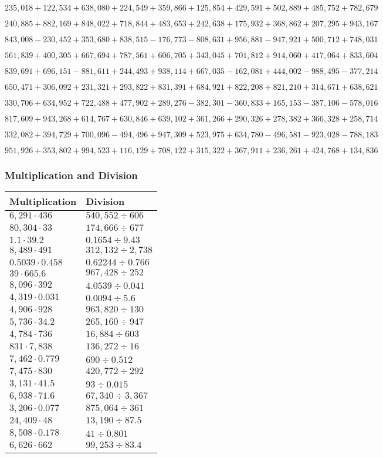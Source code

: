 \(235,018+122,534+638,080+224,549+359,866+125,854+429,591+502,889+485,752+ 782,679\)

\(240,885+882,169+848,022+718,844+483,653+242,638+175,932+368,862+207,295+943,167\)

\(843,008-230,452+353,680+838,515-176,773-808,631+956,881-947,921+500,712+748,031\)

\(561,839+400,305+667,694+787,561+606,705+343,045+701,812+914,060+417,064+833,604\)

\(839,691+696,151-881,611+244,493+938,114+667,035-162,081+444,002-988,495-377,214\)

\(650,471+306,092+231,321+293,822+831,391+684,921+822,208+821,210+314,671+638,621\)

\(330,706+634,952+722,488+477,902+289,276-382,301-360,833+165,153-387,106-578,016\)

\(817,609+943,268+614,767+630,846+639,102+361,266+290,326+278,382+366,328+258,714\)

\(332,082+394,729+700,096-494,496+947,309+523,975+634,780-496,581-923,028-788,183\)

\(951,926+353,802+994,523+116,129+708,122+315,322+367,911+236,261+424,768+134,836\)

\hypertarget{multiplication-and-division-315}{%
\subsubsection{Multiplication and
Division}\label{multiplication-and-division-315}}

\begin{longtable}[]{@{}ll@{}}
\toprule
Multiplication & Division\tabularnewline
\midrule
\endhead
\(6,291\cdot436\) & \(540,552÷606\)\tabularnewline
\(80,304\cdot33\) & \(174,666÷677\)\tabularnewline
\(1.1\cdot39.2\) & \(0.1654÷9.43\)\tabularnewline
\(8,489\cdot491\) & \(312,132÷2,738\)\tabularnewline
\(0.5039\cdot0.458\) & \(0.62244÷0.766\)\tabularnewline
\(39\cdot665.6\) & \(967,428÷252\)\tabularnewline
\(8,096\cdot392\) & \(4.0539÷0.041\)\tabularnewline
\(4,319\cdot0.031\) & \(0.0094÷5.6\)\tabularnewline
\(4,906\cdot928\) & \(963,820÷130\)\tabularnewline
\(5,736\cdot34.2\) & \(265,160÷947\)\tabularnewline
\(4,784\cdot736\) & \(16,884÷603\)\tabularnewline
\(831\cdot7,838\) & \(136,272÷16\)\tabularnewline
\(7,462\cdot0.779\) & \(690÷0.512\)\tabularnewline
\(7,475\cdot830\) & \(420,772÷292\)\tabularnewline
\(3,131\cdot41.5\) & \(93÷0.015\)\tabularnewline
\(6,938\cdot71.6\) & \(67,340÷3,367\)\tabularnewline
\(3,206\cdot0.077\) & \(875,064÷361\)\tabularnewline
\(24,409\cdot48\) & \(13,190÷87.5\)\tabularnewline
\(8,508\cdot0.178\) & \(41÷0.801\)\tabularnewline
\(6,626\cdot662\) & \(99,253÷83.4\)\tabularnewline
\bottomrule
\end{longtable}

